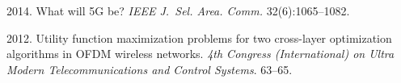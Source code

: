   \begin{multicols}{2}

\renewcommand{\bibname}{\protect\rmfamily References}

{\small\frenchspacing
 {%
 \begin{thebibliography}{99}
 2014. What will 5G be? 
\textit{IEEE J.~Sel. Area. Comm.} 32(6):1065--1082.

2012. Utility function maximization problems for two cross-layer optimization 
algorithms in OFDM wireless networks. 
\textit{4th Congress (International) on Ultra Modern Telecommunications and 
Control Systems}. 63--65.


\end{thebibliography}}}
\end{multicols}
